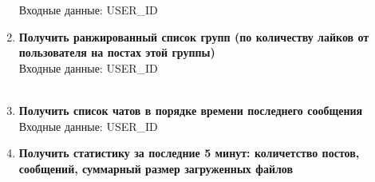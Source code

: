 \documentclass[12pt, a4paper] {ncc}
\begin{document}
\begin{enumerate}
Входные данные: USER\_ID

\item \textbf{Получить ранжированный список групп (по количеству лайков от пользователя на постах этой группы)} \\
Входные данные: USER\_ID \\\\

\item \textbf{Получить список чатов в порядке времени последнего сообщения} \\
Входные данные: USER\_ID

\item \textbf{Получить статистику за последние 5 минут: количетство постов, сообщений, суммарный размер загруженных файлов} \\

\end{enumerate}
\end{document}
